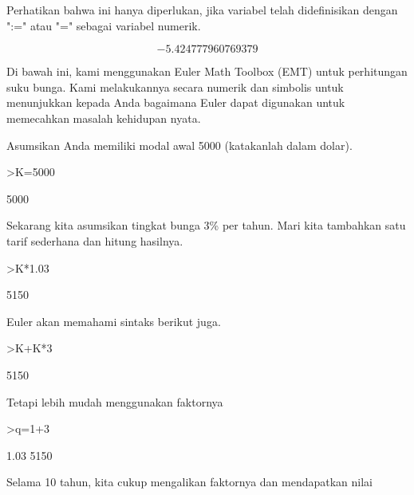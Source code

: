 \documentclass[a4paper,10pt]{article}
\begin{document}
\begin{eulernotebook}
\begin{eulercomment}
\begin{eulercomment}
\begin{eulercomment}
\begin{eulercomment}
\begin{eulercomment}
\begin{eulercomment}
\begin{eulercomment}
Perhatikan bahwa ini hanya diperlukan, jika variabel telah
didefinisikan dengan ":=" atau "=" sebagai variabel numerik.
\end{eulercomment}
\begin{eulerformula}
\[
-5.424777960769379
\]
\end{eulerformula}
\begin{eulercomment}
Di bawah ini, kami menggunakan Euler Math Toolbox (EMT) untuk
perhitungan suku bunga. Kami melakukannya secara numerik dan simbolis
untuk menunjukkan kepada Anda bagaimana Euler dapat digunakan untuk
memecahkan masalah kehidupan nyata.

Asumsikan Anda memiliki modal awal 5000 (katakanlah dalam dolar).
\end{eulercomment}
\begin{eulerprompt}
>K=5000
\end{eulerprompt}
\begin{euleroutput}
  5000
\end{euleroutput}
\begin{eulercomment}
Sekarang kita asumsikan tingkat bunga 3\% per tahun. Mari kita
tambahkan satu tarif sederhana dan hitung hasilnya.
\end{eulercomment}
\begin{eulerprompt}
>K*1.03
\end{eulerprompt}
\begin{euleroutput}
  5150
\end{euleroutput}
\begin{eulercomment}
Euler akan memahami sintaks berikut juga.
\end{eulercomment}
\begin{eulerprompt}
>K+K*3%
\end{eulerprompt}
\begin{euleroutput}
  5150
\end{euleroutput}
\begin{eulercomment}
Tetapi lebih mudah menggunakan faktornya
\end{eulercomment}
\begin{eulerprompt}
>q=1+3%
\end{eulerprompt}
\begin{euleroutput}
  1.03
  5150
\end{euleroutput}
\begin{eulercomment}
Selama 10 tahun, kita cukup mengalikan faktornya dan mendapatkan nilai

\end{eulercomment}
\end{eulercomment}
\end{eulercomment}
\end{eulercomment}
\end{eulercomment}
\end{eulercomment}
\end{eulercomment}
\end{eulernotebook}
\end{document}
